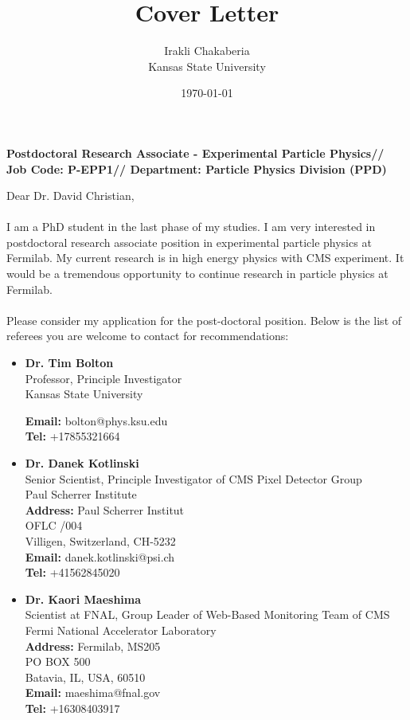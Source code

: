 \documentclass[a4paper]{article}
\title{Cover Letter}
\author{Irakli Chakaberia\\
Kansas State University}
\date{\today}
\begin{document}
\pagestyle{empty}
\fontsize{12}{15}
\selectfont
\maketitle
\thispagestyle{empty}

\textbf{Postdoctoral Research Associate - Experimental Particle Physics//
Job Code: P-EPP1//
Department: Particle Physics Division (PPD)
}

Dear Dr. David Christian,
\\
\\
I am a PhD student in the last phase of my studies. I am very interested in postdoctoral research associate position in experimental particle physics at Fermilab.
My current research is in high energy physics with CMS experiment. It would be a tremendous opportunity to continue research in particle physics at Fermilab.
\\
\\
Please consider my application for the post-doctoral position.
Below is the list of referees you are welcome to contact for recommendations:
\begin{itemize}
\item \textbf{Dr. Tim Bolton}\\
Professor, Principle Investigator\\
Kansas State University
\textbf{Email:} bolton@phys.ksu.edu\\
\textbf{Tel:} +17855321664\\

\item \textbf{Dr. Danek Kotlinski}\\
Senior Scientist, Principle Investigator of CMS Pixel Detector Group\\
Paul Scherrer Institute\\
\textbf{Address:} Paul Scherrer Institut\\
OFLC /004\\
Villigen, Switzerland, CH-5232\\
\textbf{Email:} danek.kotlinski@psi.ch\\
\textbf{Tel:} +41562845020\\

\item \textbf{Dr. Kaori Maeshima}\\
Scientist at FNAL, Group Leader of Web-Based Monitoring Team of CMS\\
Fermi National Accelerator Laboratory\\
\textbf{Address:} Fermilab, MS205\\
PO BOX 500\\
Batavia, IL, USA, 60510\\
\textbf{Email:} maeshima@fnal.gov\\
\textbf{Tel:} +16308403917\\
\end{itemize}
\end{document}
